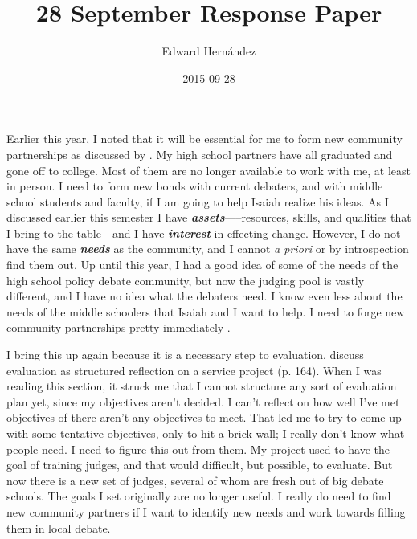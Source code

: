 \documentclass[doc,12pt]{apa6}
\begin{document}
\title{28 September Response Paper}
\author{Edward Hern\'{a}ndez}
\date{2015-09-28}
\maketitle

Earlier this year, I noted that it will be essential for me to form new
community partnerships as discussed by . 
My high school partners have all graduated and gone off to college. Most of
them are no longer available to work with me, at least in person.  I need to
form new bonds with current debaters, and with middle school students and
faculty, if I am going to help Isaiah realize his ideas. As I discussed earlier
this semester I have \textit{\textbf{assets}}—--resources, skills, and
qualities that I bring to the table—and I have \textit{\textbf{interest}} in
effecting change. However, I do not have the same \textit{\textbf{needs}} as
the community, and I cannot \emph{a priori} or by introspection find them out.
Up until this year, I had a good idea of some of the needs of the high school
policy debate community, but now the judging pool is vastly different, and I
have no idea what the debaters need. 
I know even less about the needs of the middle schoolers that Isaiah and I want
to help. I need to forge new community partnerships pretty immediately
\cite{Cress13}.

I bring this up again because it is a necessary step to evaluation.
 discuss evaluation as structured reflection on a service
project (p. 164). When I was reading this section, it struck me that I cannot
structure any sort of evaluation plan yet, since my objectives aren't decided.
I can't reflect on how well I've met objectives of there aren't any objectives
to meet. That led me to try to come up with some tentative objectives, only to
hit a brick wall; I really don't know what people need. 
I need to figure this out from them. My project used to have the goal of
training judges, and that would difficult, but possible, to evaluate.  But now
there is a new set of judges, several of whom are fresh out of big debate
schools. The goals I set originally are no longer useful. I really do need to
find new community partners if I want to identify new needs and work towards
filling them in local debate.
\end{document}
